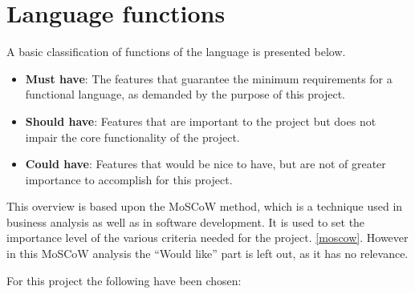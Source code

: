 \section{Language functions}
A basic classification of functions of the language is presented below.
\begin{itemize}
\item \textbf{Must have}: The features that guarantee the minimum requirements for a functional language, as demanded by the purpose of this project.

\item \textbf{Should have}: Features that are important to the project but does not impair the core functionality of the project.

\item \textbf{Could have}: Features that would be nice to have, but are not of greater importance to accomplish for this project.
\end{itemize}
This overview is based upon the MoSCoW method, which is a technique used in business analysis as well as in software development. It is used to set the importance level of the various criteria needed for the project. \ref{moscow}. However in this MoSCoW analysis the ``Would like'' part is left out, as it has no relevance. 

For this project the following have been chosen:\\

